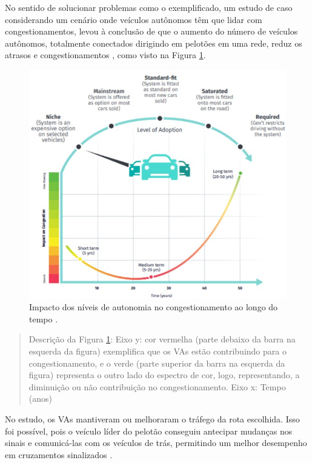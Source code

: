 No sentido de solucionar problemas como o exemplificado, um estudo de caso considerando um cenário onde veículos autônomos têm que lidar com congestionamentos, levou à conclusão de que o aumento do número de veículos autônomos, totalmente conectados dirigindo em pelotões em uma rede, reduz os atrasos e congestionamentos \cite{conge}, como visto na Figura \ref{congestionamento}.

\begin{figure}[H]
\centering
\includegraphics[width=15cm]{Figures/conge.jpg}
\caption{Impacto dos níveis de autonomia no congestionamento ao longo do tempo \cite{4cenarios_ocidental}.}
\label{congestionamento}
\end{figure}
\begin{quote}
Descrição da Figura \ref{congestionamento}: Eixo y: cor vermelha (parte debaixo da barra na esquerda da figura) exemplifica que os VAs estão contribuindo para o congestionamento, e o verde (parte superior da barra na esquerda da figura) representa o outro lado do espectro de cor, logo, representando, a diminuição ou não contribuição no congestionamento. Eixo x: Tempo (anos)

\end{quote}

No estudo, os VAs mantiveram ou melhoraram o tráfego da rota escolhida. Isso foi possível, pois o veículo líder do pelotão conseguiu antecipar mudanças nos sinais e comunicá-las com os veículos de trás, permitindo um melhor desempenho em cruzamentos sinalizados \cite{conge}.

